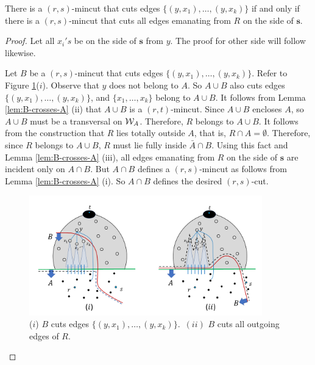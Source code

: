 \begin{lemma}
\label{lem:reachability-cone-u-v-mincut}
There is a $(r,s)$-mincut that cuts edges $\{(y,x_1),\ldots, (y,x_k)\}$ if and only if there is a $(r,s)$-mincut that cuts all edges emanating from $R$ on the side of $\mathbf{s}$.
\end{lemma}
\begin{proof}
Let all $x_i's$ be on the side of $\mathbf s$ from $y$. The proof for other side will follow likewise.

Let $B$ be a $(r,s)$-mincut that cuts edges $\{(y,x_1),…,(y,x_k)\}$. 
Refer to Figure \ref{fig:B-crosses-A}($i$).
Observe that $y$ does not belong to $A$. So $A\cup B$ also cuts edges $\{(y,x_1),…,(y,x_k)\}$, and $\{x_1,\ldots,x_k\}$ belong to $A\cup B$.
It follows from  Lemma \ref{lem:B-crosses-A} (ii) that $A\cup B$ is a $(r,t)$-mincut. Since $A\cup B$ encloses $A$, so
$A\cup B$ must be a transversal on ${\cal W}_A$.  Therefore,
$R$ belongs to $A\cup B$.
It follows from the construction that $R$ lies totally outside $A$, that is, $R\cap A=\emptyset$. Therefore, since
$R$ belongs to $A\cup B$, $R$ must lie fully inside $\bar{A}\cap B$. 
Using this fact and Lemma \ref{lem:B-crosses-A} (iii), all edges emanating from $R$ on the side of $\mathbf{s}$
are incident only on $A\cap B$. But $A\cap B$ defines a $(r,s)$-mincut as follows from Lemma \ref{lem:B-crosses-A} (i). 
So $A\cap B$ defines the desired $(r,s)$-cut.
\begin{figure}[h]
    \centering
    \includegraphics[width=0.9\textwidth]{src/images/B-crosses-A.png}{}
    \caption{($i$) $B$ cuts edges $\{(y,x_1),\ldots,(y,x_k)\}$.~$(ii)$ $B$ cuts all outgoing edges of $R$.}
    \label{fig:B-crosses-A}
\end{figure}


\end{proof}
